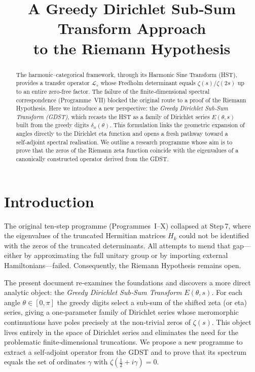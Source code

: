 \documentclass[11pt,a4paper]{article}
\title{\bfseries A Greedy Dirichlet Sub‑Sum Transform Approach\\
to the Riemann Hypothesis}
\author{}
\date{}
\theoremstyle{remark}
\begin{document}
\maketitle

\begin{abstract}
The harmonic–categorical framework, through its Harmonic Sine Transform (HST), provides a transfer operator \(\mathcal{L}_s\) whose Fredholm determinant equals \(\zeta(s)/\zeta(2s)\) up to an entire zero‑free factor.  The failure of the finite‑dimensional spectral correspondence (Programme~VII) blocked the original route to a proof of the Riemann Hypothesis.  Here we introduce a new perspective: the \emph{Greedy Dirichlet Sub‑Sum Transform (GDST)}, which recasts the HST as a family of Dirichlet series \(E(\theta,s)\) built from the greedy digits \(\delta_n(\theta)\).  This formulation links the geometric expansion of angles directly to the Dirichlet eta function and opens a fresh pathway toward a self‑adjoint spectral realisation.  We outline a research programme whose aim is to prove that the zeros of the Riemann zeta function coincide with the eigenvalues of a canonically constructed operator derived from the GDST.
\end{abstract}

\section{Introduction}
The original ten‑step programme (Programmes~I–X) collapsed at Step 7, where the eigenvalues of the truncated Hermitian matrices \(H_k\) could not be identified with the zeros of the truncated determinants.  All attempts to mend that gap—either by approximating the full unitary group or by importing external Hamiltonians—failed.  Consequently, the Riemann Hypothesis remains open.

The present document re‑examines the foundations and discovers a more direct analytic object: the \emph{Greedy Dirichlet Sub‑Sum Transform} \(E(\theta,s)\).  For each angle \(\theta\in[0,\pi]\) the greedy digits select a sub‑sum of the shifted zeta (or eta) series, giving a one‑parameter family of Dirichlet series whose meromorphic continuations have poles precisely at the non‑trivial zeros of \(\zeta(s)\).  This object lives entirely in the space of Dirichlet series and eliminates the need for the problematic finite‑dimensional truncations.  We propose a new programme to extract a self‑adjoint operator from the GDST and to prove that its spectrum equals the set of ordinates \(\gamma\) with \(\zeta(\frac12+i\gamma)=0\).
\end{document}
